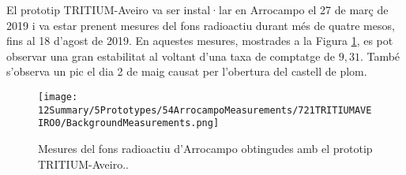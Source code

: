 El prototip TRITIUM-Aveiro va ser instal·lar en Arrocampo el 27 de març de 2019 i va estar prenent mesures del fons radioactiu durant més de quatre mesos, fins al 18 d'agost de 2019. En aquestes mesures, mostrades a la Figura \ref{fig:FonsArrocampoAveiro}, es pot observar una gran estabilitat al voltant d'una taxa de comptatge de $9,31$. També s'observa un pic el dia 2 de maig causat per l'obertura del castell de plom.

\begin{figure}[h]
\centering
\texttt{[image: 12Summary/5Prototypes/54ArrocampoMeasurements/721TRITIUMAVEIRO0/BackgroundMeasurements.png]}
\caption{Mesures del fons radioactiu d'Arrocampo obtingudes amb el prototip TRITIUM-Aveiro.\cite{ExperimentalPaperCarlos}.\label{fig:FonsArrocampoAveiro}}
\end{figure}